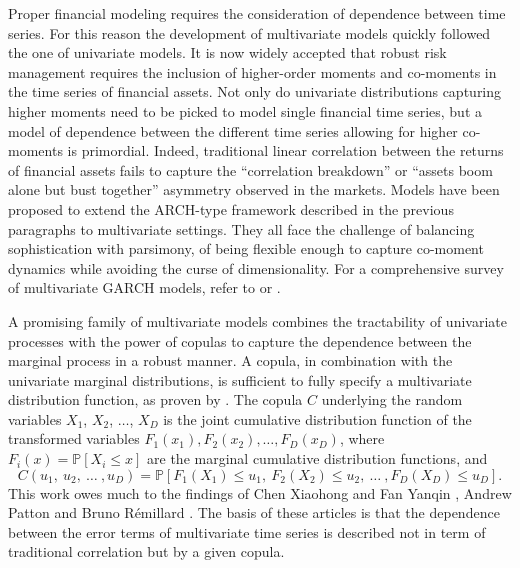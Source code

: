 Proper financial modeling requires the consideration of dependence
between time series. For this reason the development of multivariate models
quickly followed the one of univariate models. It is now widely accepted
\citep{cont01, yue12} that robust risk management requires the inclusion of
higher-order moments and co-moments in the time series of financial assets.
Not only do univariate distributions capturing higher moments need to be picked
to model single financial time series, but a model of dependence between the
different time series allowing for higher co-moments is primordial. Indeed,
traditional linear correlation between the returns of financial assets fails
to capture the ``correlation breakdown'' or ``assets boom alone but bust
together'' asymmetry observed in the markets. Models have been proposed to
extend the ARCH-type framework described in the  previous paragraphs to
multivariate settings. They all face the challenge of balancing sophistication
with parsimony, of being flexible enough to capture co-moment dynamics while
avoiding the curse of dimensionality. For a comprehensive survey of
multivariate GARCH models, refer to \cite{silvennoinen08} or \cite{laurent06}.

A promising family of multivariate models combines the tractability of univariate
processes with the power of copulas to capture the dependence between the marginal
process in a robust manner. A copula, in combination with the univariate marginal
distributions,  is sufficient to fully specify a multivariate distribution
function, as proven by \cite{sklar59}. The copula $C$ underlying the random
variables $X_1$, $X_2$, $\ldots$, $X_D$ is the joint cumulative distribution
function of the transformed variables $F_1(x_1), F_2(x_2), \ldots,  F_D(x_D)$,
where $F_i(x)=\mathbb{P}[X_i \leq x]$ are the marginal cumulative distribution
functions, and
\begin{displaymath}
C(u_1, \ u_2, \ \ldots \ , u_D)=\mathbb{P}[F_1(X_1) \leq u_1, \
F_2(X_2) \leq u_2, \ \ldots \ , F_D(X_D) \leq u_D].
\end{displaymath}
This work owes much to the findings of Chen Xiaohong and Fan Yanqin
\citep{chenfan06}, Andrew Patton \citep{patton00,patton06} and Bruno
R\'emillard \citep{Remillard11}. The basis of these articles is that
the dependence between the error terms of multivariate time series
is described not in term of traditional correlation but by a given
copula.

